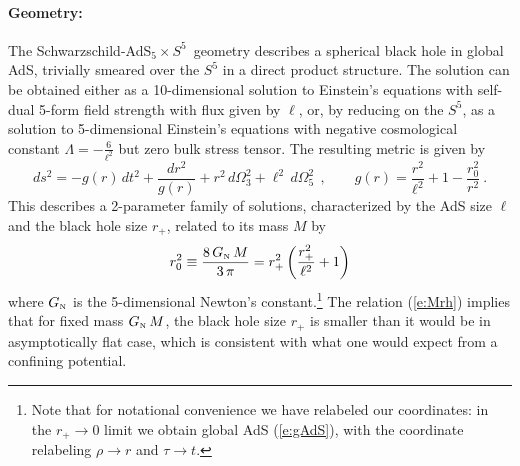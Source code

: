 \documentclass[12pt]{article}
\def\req#1{(\ref{#1})}
\def\schw{Schwarzschild}
\def\GN{G_{\scriptscriptstyle {\rm N}}}
\def\adss#1#2{AdS$_{#1} \times S^{#2}$}
\def\Rads{\ell}
\def\rh{r_+}
\begin{document}
\paragraph{Geometry:}  %
The \schw-\adss55\  geometry describes a spherical black hole in global AdS, trivially smeared over the $S^5$ in a direct product structure.
The solution can be obtained either as a 10-dimensional solution to Einstein's equations with self-dual 5-form field strength with flux given by $\Rads$, or, by reducing on the $S^5$, as a solution to 5-dimensional Einstein's equations with negative cosmological constant $\Lambda = - \frac{6}{\Rads^2}$ but zero bulk stress tensor.
The resulting metric is given by
%
\begin{equation}
ds^2 = - g(r) \, dt^2 + \frac{dr^2}{g(r)} + r^2 \, d\Omega_3^2 + \Rads^2 \, d\Omega_5^2
 \ \ , \qquad
g(r) = \frac{r^2}{\Rads^2} +1 - \frac{r_0^2}{r^2} \ .
\label{e:SAdS}
\end{equation}	
%
This describes a 2-parameter family of solutions, characterized by the AdS size $\Rads$ and the black hole size $\rh$, related to its mass $M$ by
%
\begin{equation}
r_0^2 \equiv \frac{8 \, \GN \, M}{3\, \pi} 
= \rh^2 \left( \frac{\rh^2}{\Rads^2} +1 \right)
\label{e:Mrh}
\end{equation}	
%
 where $\GN$ is the 5-dimensional Newton's constant.\footnote{
 Note that for notational convenience we have relabeled our coordinates: in the $\rh \to 0 $ limit we obtain global AdS \req{e:gAdS}, with the coordinate relabeling $\rho \to r$ and $\tau \to t$.
 }
 The relation \req{e:Mrh} implies that for fixed mass $\GN \, M$, the  black hole size $\rh$ is smaller than it would be in asymptotically flat case, which is consistent with what one would expect from a confining potential.
 
\end{document}
